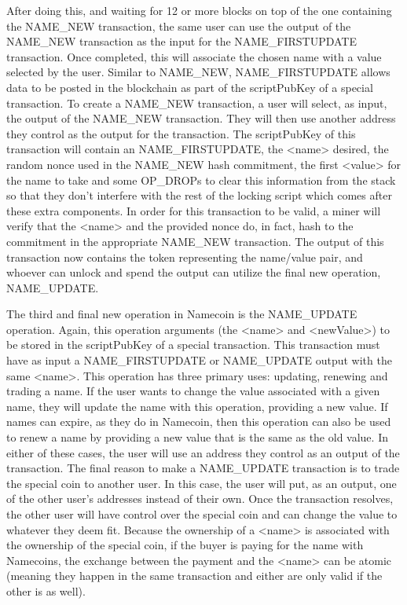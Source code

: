 After doing this, and waiting for 12 or more blocks on top of the one containing the NAME\_NEW transaction, the same user can use the output of the NAME\_NEW transaction as the input for the NAME\_FIRSTUPDATE transaction. Once completed, this will associate the chosen name with a value selected by the user. Similar to NAME\_NEW, NAME\_FIRSTUPDATE allows data to be posted in the blockchain as part of the scriptPubKey of a special transaction. 
To create a NAME\_NEW transaction, a user will select, as input, the output of the NAME\_NEW transaction. They will then use another address they control as the output for the transaction. The scriptPubKey of this transaction will contain an NAME\_FIRSTUPDATE, the <name> desired, the random nonce used in the NAME\_NEW hash commitment, the first <value> for the name to take and some OP\_DROPs to clear this information from the stack so that they don't interfere with the rest of the locking script which comes after these extra components. In order for this transaction to be valid, a miner will verify that the <name> and the provided nonce do, in fact, hash to the commitment in the appropriate  NAME\_NEW transaction. The output of this transaction now contains the token representing the name/value pair, and whoever can unlock and spend the output can utilize the final new operation, NAME\_UPDATE.

The third and final new operation in Namecoin is the NAME\_UPDATE operation. Again, this operation arguments (the <name> and <newValue>) to be stored in the scriptPubKey of a special transaction. This transaction must have as input a NAME\_FIRSTUPDATE or NAME\_UPDATE output with the same <name>. This operation has three primary uses: updating, renewing and trading a name. If the user wants to change the value associated with a given name, they will update the name with this operation, providing a new value. If names can expire, as they do in Namecoin, then this operation can also be used to renew a name by providing a new value that is the same as the old value. In either of these cases, the user will use an address they control as an output of the transaction. The final reason to make a NAME\_UPDATE transaction is to trade the special coin to another user. In this case, the user will put, as an output, one of the other user's addresses instead of their own. Once the transaction resolves, the other user will have control over the special coin and can change the value to whatever they deem fit. Because the ownership of a <name> is associated with the ownership of the special coin, if the buyer is paying for the name with Namecoins,  the exchange between the payment and the <name> can be atomic (meaning they happen in the same transaction and either are only valid if the other is as well). 

